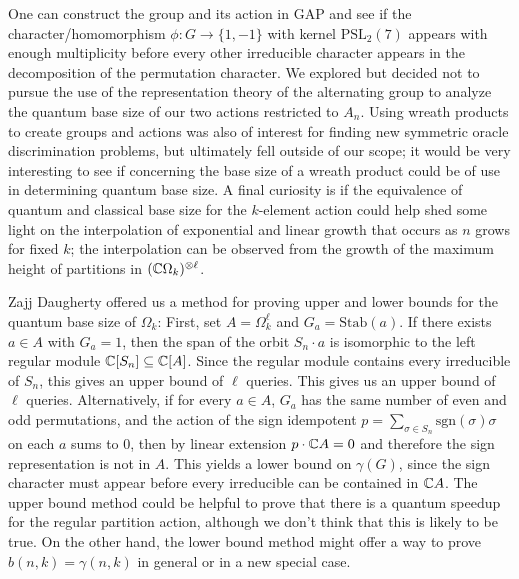 \documentclass[12pt,twoside]{reedthesis}
\theoremstyle{plain}   %
\theoremstyle{definition}
\theoremstyle{remark}
\numberwithin{equation}{section}
\def\stab{\mathrm{Stab}}
\begin{document}
One can construct the group and its action in GAP and see if the character/homomorphism $\phi: G \to \{1,-1\}$ with kernel $\mathrm{PSL}_2(7)$ appears with enough multiplicity before every other
irreducible character appears in the decomposition of
the permutation character.
We explored but decided not to pursue the use of the representation theory of the alternating group to analyze the quantum base size of our two actions restricted to $A_n$.
Using wreath products to create groups and actions was also of interest for finding new symmetric oracle discrimination problems, but ultimately fell outside of our scope;
it would be very interesting to see if \cite[Theorem 1.3]{valle24} concerning the base size of a wreath product could be of use in determining quantum base size.
A final curiosity is if the equivalence of quantum and classical base size for the $k$-element action could help shed some light on the interpolation of exponential and linear growth that occurs
as $n$ grows for fixed $k$; the interpolation can be observed from the growth of the maximum height of partitions in $(\mathbb{C} \Omega_k)^{\otimes \ell}$. \par
Zajj Daugherty offered us a method for proving upper and lower bounds for the quantum base size of $\Omega_k$:
First, set \(A=\Omega_k^\ell\) and \(G_a=\stab(a)\). If there exists \(a\in A\) with \(G_a=1\), then the span of the orbit \(S_n\cdot a\) is isomorphic to the left regular module \(\mathbb{C}[S_n]\subseteq\mathbb{C}[A]\).
Since the regular module contains every irreducible of \(S_n\), this gives an upper bound of \(\ell\) queries.
This gives us an upper bound of $\ell$ queries.
Alternatively, if for every $a \in A$, $G_a$ has the same number of even and odd permutations, and the action of the sign idempotent $p = \sum_{\sigma \in S_n} \mathrm{sgn}(\sigma) \sigma$ on each $a$ sums to $0$,
then by linear extension $p \cdot \mathbb{C} A = 0$ and therefore the sign representation is not in $A$. This yields a lower bound on $\gamma(G)$, since the sign character must appear before every irreducible can be contained in $\mathbb{C} A$.
The upper bound method could be helpful to prove that there is a quantum speedup for the regular partition action, although we don't think that this is likely to be true.
On the other hand, the lower bound method might offer a way to prove $b(n,k) = \gamma(n,k)$ in general or in a new special case.
\end{document}
